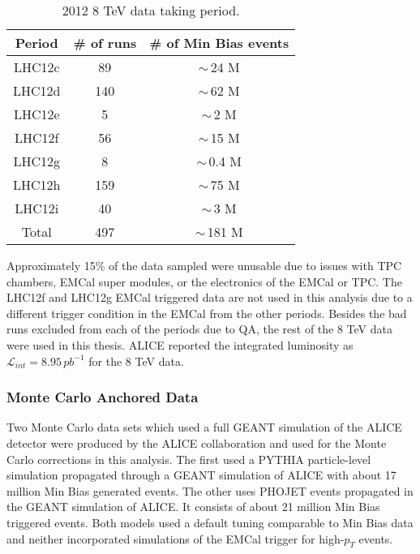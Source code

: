 \begin{table}[t!]

\begin{center}
\caption{2012 8 TeV data taking period.}
\begin{tabular}[b]{|c|c|c|}
	\hline
	Period & \# of runs & \# of Min Bias events \\ \hline
	LHC12c & 89 & $\sim \,$24 M \\ \hline
	LHC12d & 140 & $\sim \,$62 M \\ \hline
	LHC12e & 5 & $\sim \,$2 M \\ \hline
	LHC12f & 56 & $\sim \,$15 M \\ \hline
	LHC12g & 8 & $\sim \,$0.4 M \\ \hline
	LHC12h & 159 & $\sim \,$75 M \\ \hline
	LHC12i & 40 & $\sim \,$3 M \\ \hline
	Total & 497 & $\sim \,$181 M \\ \hline

\end{tabular}
\end{center}
\label{tab:RunSummary}
\end{table}

Approximately 15\% of the data sampled were unusable due to issues with TPC chambers, EMCal super modules, or the electronics of the EMCal or TPC.  The LHC12f and LHC12g EMCal triggered data are not used in this analysis due to a different trigger condition in the EMCal from the other periods.  Besides the bad runs excluded from each of the periods due to QA, the rest of the 8 TeV data were used in this thesis.  ALICE reported the integrated luminosity as $\mathscr{L}_{int} = 8.95 \, pb^{-1}$ for the 8 TeV data\cite{ALICE-PUBLIC-2017-002}.

\subsubsection{Monte Carlo Anchored Data}
Two Monte Carlo data sets which used a full GEANT simulation of the ALICE detector were produced by the ALICE collaboration and used for the Monte Carlo corrections in this analysis.   The first used a PYTHIA particle-level simulation propagated through a GEANT simulation of ALICE with about 17 million Min Bias generated events. The other uses PHOJET events propagated in the GEANT simulation of ALICE.  It consists of about 21 million Min Bias triggered events.  Both models used a default tuning comparable to Min Bias data and neither incorporated simulations of the EMCal trigger for high-$p_{T}$ events.

